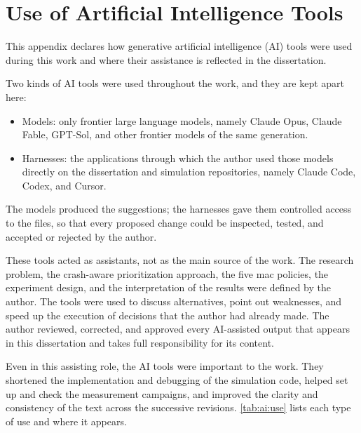 \chapter{Use of Artificial Intelligence Tools}
\label{apend:ai}

This appendix declares how generative artificial intelligence (AI) tools were used during this work and where their assistance is reflected in the dissertation.

Two kinds of AI tools were used throughout the work, and they are kept apart here:
\begin{itemize}
	\item Models: only frontier large language models, namely Claude Opus, Claude Fable, GPT-Sol, and other frontier models of the same generation.
	\item Harnesses: the applications through which the author used those models directly on the dissertation and simulation repositories, namely Claude Code, Codex, and Cursor.
\end{itemize}

The models produced the suggestions; the harnesses gave them controlled access to the files, so that every proposed change could be inspected, tested, and accepted or rejected by the author.

These tools acted as assistants, not as the main source of the work.
The research problem, the crash-aware prioritization approach, the five \gls{mac} policies, the experiment design, and the interpretation of the results were defined by the author.
The tools were used to discuss alternatives, point out weaknesses, and speed up the execution of decisions that the author had already made.
The author reviewed, corrected, and approved every AI-assisted output that appears in this dissertation and takes full responsibility for its content.

Even in this assisting role, the AI tools were important to the work.
They shortened the implementation and debugging of the simulation code, helped set up and check the measurement campaigns, and improved the clarity and consistency of the text across the successive revisions.
\autoref{tab:ai:use} lists each type of use and where it appears.


